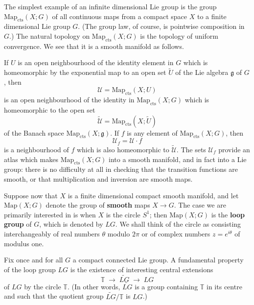 \documentclass[12pt]{article}
\begin{document}
\begin{example}
    The simplest example of an infinite dimensional Lie group is the group $\mathrm{Map}_{\mathrm{cts}}(X; G)$
    of all continuous maps from a compact space $X$ to a finite dimensional
    Lie group $G$. (The group law, of course, is pointwise composition in $G$.)
    The natural topology on $\mathrm{Map}_{\mathrm{cts}}(X; G)$ is the topology
    of uniform convergence. We see that it is a smooth manifold as follows.

    If $U$ is an open neighbourhood of the identity element in $G$ which is
    homeomorphic by the exponential map to an open set $\tilde U$ of the Lie
    algebra $\mathfrak{g}$ of $G$, then
    \[
        \mathcal{U} = \mathrm{Map}_{\mathrm{cts}}(X; U)
    \]
    is an open neighbourhood of the identity in $\mathrm{Map}_{\mathrm{cts}}(X; G)$
    which is homeomorphic to the open set
    \[
        \tilde{\mathcal{U}} = \mathrm{Map}_{\mathrm{cts}}(X; \tilde U)
    \]
    of the Banach space $\mathrm{Map}_{\mathrm{cts}}(X; \mathfrak{g})$. If $f$
    is any element of $\mathrm{Map}_{\mathrm{cts}}(X; G)$, then
    \[
        \mathcal{U}_f = \mathcal{U}\cdot f
    \]
    is a neighbourhood of $f$ which is also homeomorphic to $\tilde{\mathcal{U}}$.
    The sets $\mathcal{U}_f$ provide an atlas which makes
    $\mathrm{Map}_{\mathrm{cts}}(X; G)$ into a smooth manifold, and in fact into a Lie group: there is no difficulty at all in checking that the transition functions are smooth, or that multiplication and inversion are smooth maps.
\end{example}

\begin{definition}
    Suppose now that $X$ is a finite dimensional compact smooth manifold,
    and let $\mathrm{Map}(X; G)$ denote the group of \textbf{smooth} maps $X \to G$. The case we are primarily interested in is when $X$ is the circle $S^1$;  then $\mathrm{Map}(X; G)$ is the \textbf{loop group} of $G$, which is denoted by $LG$. We shall think of the circle as consisting interchangeably of real numbers $\theta$ modulo $2\pi$ or of complex numbers $z = e^{i\theta}$ of  modulus one.
\end{definition}


Fix once and for all $G$ a compact connected Lie group. A fundamental property of the loop group $LG$ is the existence of interesting central extensions
\[
    \mathbb{T} \;\to\; \widetilde{LG} \;\to\; LG
\]
of $LG$ by the circle $\mathbb{T}$. (In other words, $\widetilde{LG}$ is a group
containing $\mathbb{T}$ in its centre and such that the quotient group
$\widetilde{LG}/\mathbb{T}$ is $LG$.)
\end{document}
